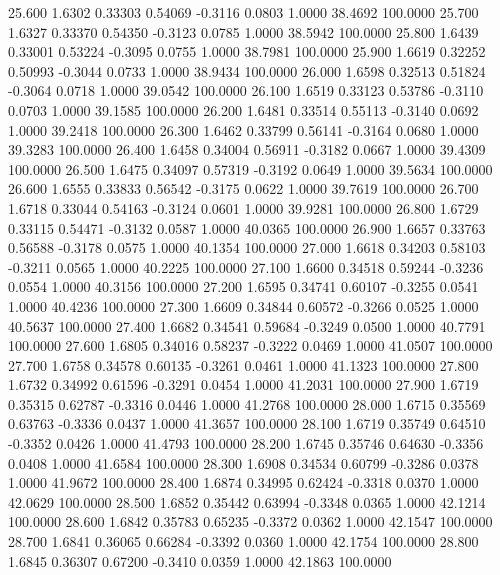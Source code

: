   25.600   1.6302   0.33303   0.54069  -0.3116   0.0803   1.0000  38.4692 100.0000
  25.700   1.6327   0.33370   0.54350  -0.3123   0.0785   1.0000  38.5942 100.0000
  25.800   1.6439   0.33001   0.53224  -0.3095   0.0755   1.0000  38.7981 100.0000
  25.900   1.6619   0.32252   0.50993  -0.3044   0.0733   1.0000  38.9434 100.0000
  26.000   1.6598   0.32513   0.51824  -0.3064   0.0718   1.0000  39.0542 100.0000
  26.100   1.6519   0.33123   0.53786  -0.3110   0.0703   1.0000  39.1585 100.0000
  26.200   1.6481   0.33514   0.55113  -0.3140   0.0692   1.0000  39.2418 100.0000
  26.300   1.6462   0.33799   0.56141  -0.3164   0.0680   1.0000  39.3283 100.0000
  26.400   1.6458   0.34004   0.56911  -0.3182   0.0667   1.0000  39.4309 100.0000
  26.500   1.6475   0.34097   0.57319  -0.3192   0.0649   1.0000  39.5634 100.0000
  26.600   1.6555   0.33833   0.56542  -0.3175   0.0622   1.0000  39.7619 100.0000
  26.700   1.6718   0.33044   0.54163  -0.3124   0.0601   1.0000  39.9281 100.0000
  26.800   1.6729   0.33115   0.54471  -0.3132   0.0587   1.0000  40.0365 100.0000
  26.900   1.6657   0.33763   0.56588  -0.3178   0.0575   1.0000  40.1354 100.0000
  27.000   1.6618   0.34203   0.58103  -0.3211   0.0565   1.0000  40.2225 100.0000
  27.100   1.6600   0.34518   0.59244  -0.3236   0.0554   1.0000  40.3156 100.0000
  27.200   1.6595   0.34741   0.60107  -0.3255   0.0541   1.0000  40.4236 100.0000
  27.300   1.6609   0.34844   0.60572  -0.3266   0.0525   1.0000  40.5637 100.0000
  27.400   1.6682   0.34541   0.59684  -0.3249   0.0500   1.0000  40.7791 100.0000
  27.600   1.6805   0.34016   0.58237  -0.3222   0.0469   1.0000  41.0507 100.0000
  27.700   1.6758   0.34578   0.60135  -0.3261   0.0461   1.0000  41.1323 100.0000
  27.800   1.6732   0.34992   0.61596  -0.3291   0.0454   1.0000  41.2031 100.0000
  27.900   1.6719   0.35315   0.62787  -0.3316   0.0446   1.0000  41.2768 100.0000
  28.000   1.6715   0.35569   0.63763  -0.3336   0.0437   1.0000  41.3657 100.0000
  28.100   1.6719   0.35749   0.64510  -0.3352   0.0426   1.0000  41.4793 100.0000
  28.200   1.6745   0.35746   0.64630  -0.3356   0.0408   1.0000  41.6584 100.0000
  28.300   1.6908   0.34534   0.60799  -0.3286   0.0378   1.0000  41.9672 100.0000
  28.400   1.6874   0.34995   0.62424  -0.3318   0.0370   1.0000  42.0629 100.0000
  28.500   1.6852   0.35442   0.63994  -0.3348   0.0365   1.0000  42.1214 100.0000
  28.600   1.6842   0.35783   0.65235  -0.3372   0.0362   1.0000  42.1547 100.0000
  28.700   1.6841   0.36065   0.66284  -0.3392   0.0360   1.0000  42.1754 100.0000
  28.800   1.6845   0.36307   0.67200  -0.3410   0.0359   1.0000  42.1863 100.0000
